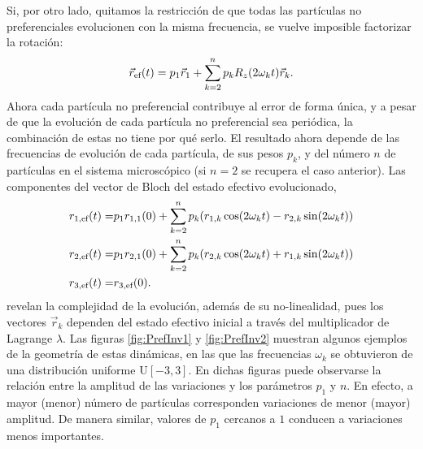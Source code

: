 Si, por otro lado, quitamos la restricción de que todas las partículas no preferenciales evolucionen con la misma frecuencia, se vuelve imposible factorizar la rotación:
\begin{equation}
    \vec{r}_{\text{ef}}(t)=p_{1}\vec{r}_{1}+\sum_{k=2}^{n} p_{k}R_{z}(2\omega_{k} t)\vec{r}_{k}.\nonumber
\end{equation}
Ahora cada partícula no preferencial contribuye al error de forma única, y a pesar de que la evolución de cada partícula no preferencial sea periódica, la combinación de estas no tiene por qué serlo. El resultado ahora depende de las frecuencias de evolución de cada partícula, de sus pesos $p_{k}$, y del número $n$ de partículas en el sistema microscópico (si $n=2$ se recupera el caso anterior). Las componentes del vector de Bloch del estado efectivo evolucionado,
\begin{align}
    r_{1,\text{ef}}(t)=&p_{1}r_{1,1}(0)+\sum_{k=2}^{n}p_{k}(r_{1,k}\cos(2\omega_{k} t)-r_{2,k}\sin(2\omega_{k} t))\nonumber\\
    r_{2,\text{ef}}(t)=&p_{1}r_{2,1}(0)+\sum_{k=2}^{n}p_{k}(r_{2,k}\cos(2\omega_{k} t)+r_{1,k}\sin(2\omega_{k} t))\nonumber\\
    r_{3,\text{ef}}(t)=&r_{3,\text{ef}}(0).\nonumber
\end{align}
revelan la complejidad de la evolución, además de su no-linealidad, pues los vectores $\vec{r}_{k}$ dependen del estado efectivo inicial a través del multiplicador de Lagrange $\lambda.$ Las figuras \ref{fig:PrefInv1} y \ref{fig:PrefInv2} muestran algunos ejemplos de la geometría de estas dinámicas, en las que las frecuencias $\omega_{k}$ se obtuvieron de una distribución uniforme $\text{U}[-3,3]$. En dichas figuras puede observarse la relación entre la amplitud de las variaciones y los parámetros $p_{1}$ y $n$. En efecto, a mayor (menor) número de partículas corresponden variaciones de menor (mayor) amplitud. De manera similar, valores de $p_{1}$ cercanos a $1$ conducen a variaciones menos importantes.

